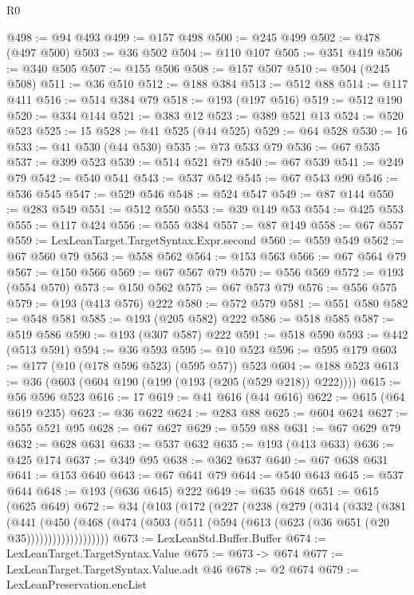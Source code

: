 \begin{lexlean}{R0}
\begin{coremodule}
{{{{{{{{{{{{{{{{{{{{{{{{{{{{{{{{@498 := @94 @493
@499 := @157 @498
@500 := @245 @499
@502 := @478 (@497 @500)
@503 := @36 @502
@504 := @110 @107
@505 := @351 @419
@506 := @340 @505
@507 := @155 @506
@508 := @157 @507
@510 := @504 (@245 @508)
@511 := @36 @510
@512 := @188 @384
@513 := @512 @88
@514 := @117 @411
@516 := @514 @384 @79
@518 := @193 (@197 @516)
@519 := @512 @190
@520 := @334 @144
@521 := @383 @12
@523 := @389 @521 @13
@524 := @520 @523
@525 := 15
@528 := @41 @525 (@44 @525)
@529 := @64 @528
@530 := 16
@533 := @41 @530 (@44 @530)
@535 := @73 @533 @79
@536 := @67 @535
@537 := @399 @523
@539 := @514 @521 @79
@540 := @67 @539
@541 := @249 @79
@542 := @540 @541
@543 := @537 @542
@545 := @67 @543 @90
@546 := @536 @545
@547 := @529 @546
@548 := @524 @547
@549 := @87 @144
@550 := @283 @549
@551 := @512 @550
@553 := @39 @149 @53
@554 := @425 @553
@555 := @117 @424
@556 := @555 @384
@557 := @87 @149
@558 := @67 @557
@559 := LexLeanTarget.TargetSyntax.Expr.second
@560 := @559 @549
@562 := @67 @560 @79
@563 := @558 @562
@564 := @153 @563
@566 := @67 @564 @79
@567 := @150 @566
@569 := @67 @567 @79
@570 := @556 @569
@572 := @193 (@554 @570)
@573 := @150 @562
@575 := @67 @573 @79
@576 := @556 @575
@579 := @193 (@413 @576) @222
@580 := @572 @579
@581 := @551 @580
@582 := @548 @581
@585 := @193 (@205 @582) @222
@586 := @518 @585
@587 := @519 @586
@590 := @193 (@307 @587) @222
@591 := @518 @590
@593 := @442 (@513 @591)
@594 := @36 @593
@595 := @10 @523
@596 := @595 @179
@603 := @177 (@10 (@178 @596 @523) (@595 @57)) @523
@604 := @188 @523
@613 := @36 (@603 (@604 @190 (@199 (@193 (@205 (@529 @218)) @222))))
@615 := @56 @596 @523
@616 := 17
@619 := @41 @616 (@44 @616)
@622 := @615 (@64 @619 @235)
@623 := @36 @622
@624 := @283 @88
@625 := @604 @624
@627 := @555 @521 @95
@628 := @67 @627
@629 := @559 @88
@631 := @67 @629 @79
@632 := @628 @631
@633 := @537 @632
@635 := @193 (@413 @633)
@636 := @425 @174
@637 := @349 @95
@638 := @362 @637
@640 := @67 @638 @631
@641 := @153 @640
@643 := @67 @641 @79
@644 := @540 @643
@645 := @537 @644
@648 := @193 (@636 @645) @222
@649 := @635 @648
@651 := @615 (@625 @649)
@672 := @34
    (@103
      (@172
        (@227
          (@238
            (@279
              (@314
                (@332
                  (@381
                    (@441
                      (@450
                        (@468
                          (@474 (@503 (@511 (@594 (@613 (@623 (@36 @651 (@20 @35)))))))))))))))))))
@673 := LexLeanStd.Buffer.Buffer
@674 := LexLeanTarget.TargetSyntax.Value
@675 := @673 -> @674
@677 := LexLeanTarget.TargetSyntax.Value.adt @46
@678 := @2 @674
@679 := LexLeanPreservation.encList
}}}}}}}}}}}}}}}}}}}}}}}}}}}}}}}}
\end{coremodule}
\end{lexlean}
